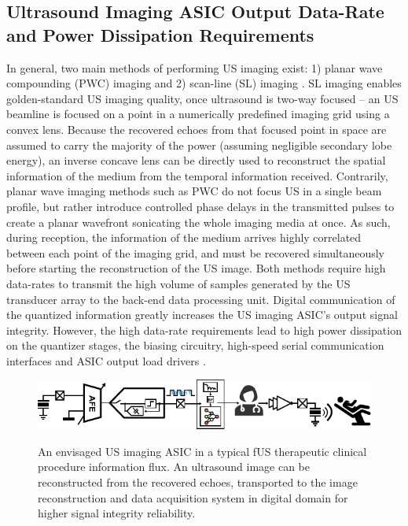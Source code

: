 \subsection{Ultrasound Imaging ASIC Output Data-Rate and Power Dissipation Requirements}
\label{subsec:ultrasound_imaging_data_rate}
In general, two main methods of performing US imaging 
exist: 1) planar wave compounding (PWC) imaging and 2) scan-line (SL) imaging \cite{Szabo2014}. SL imaging enables golden-standard US imaging quality, once ultrasound is two-way focused -- an US beamline is focused on a point in a numerically predefined imaging grid using a convex lens. Because the recovered echoes from that focused point in space are assumed to carry the majority of the power (assuming negligible secondary lobe energy), an inverse concave lens can be directly used to reconstruct the spatial information of the medium from the temporal information received. Contrarily, planar wave imaging methods such as PWC do not focus US in a single beam profile, but rather introduce controlled phase delays in the transmitted pulses to create a planar wavefront sonicating the whole imaging media at once. As such, during reception, the information of the medium arrives highly correlated between each point of the imaging grid, and must be recovered simultaneously before starting the reconstruction of the US image. Both methods require high data-rates to transmit the high volume of samples generated by the US transducer array to the back-end data processing unit. Digital communication of the quantized information greatly increases the US imaging ASIC's output signal integrity. 
However, the high data-rate requirements lead to high power dissipation on the quantizer stages, the biasing circuitry, high-speed serial communication
interfaces and ASIC output load drivers \cite{Hopf2023, Chen2017, 
Tan2018, Jung2018}. 

\begin{figure}[bp]
  \centering
  \includegraphics[width=\textwidth]{Chapters/Figures/Introduction/high_power_approach.pdf}
  \label{fig:high_power_solution}
  \caption{An envisaged US imaging ASIC in a typical fUS therapeutic clinical procedure  information flux. An ultrasound image can be reconstructed from the recovered echoes, transported to the image reconstruction and data acquisition system in digital domain for higher signal integrity reliability.}
\end{figure}


